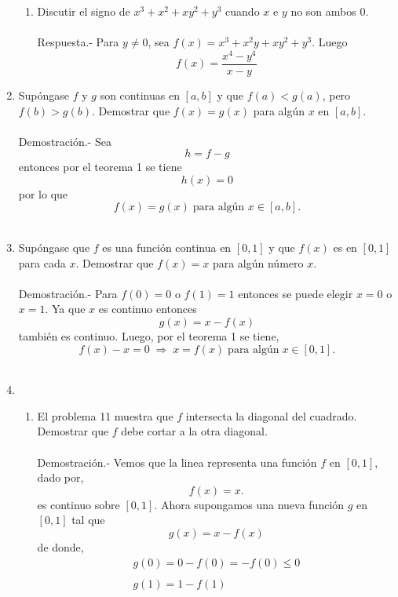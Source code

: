 \begin{enumerate}
\begin{enumerate}[\bfseries (a)]
	\item Discutir el signo de $x^3+x^2+xy^2+y^3$ cuando $x$ e $y$ no son ambos $0$.\\\\
	    Respuesta.-\; Para $y\neq 0$, sea $f(x)=x^3+x^2y+xy^2+y^3$. Luego
	    $$f(x)=\dfrac{x^4-y^4}{x-y}$$

    \end{enumerate}

\item Supóngase $f$ y $g$ son continuas en $[a,b]$ y que $f(a)<g(a)$, pero $f(b)>g(b)$. Demostrar que $f(x)=g(x)$ para algún $x$ en $[a,b]$.\\\\
    Demostración.-\; Sea $$h=f-g$$
    entonces por el teorema 1 se tiene $$h(x)=0$$
    por lo que $$f(x)=g(x)\; \mbox{para algún }x \in [a,b].$$\\

\item Supóngase que $f$ es una función continua en $[0,1]$ y que $f(x)$ es en $[0,1]$ para cada $x$. Demostrar que $f(x)=x$ para algún número $x$.\\\\
    Demostración.-\; Para $f(0)=0$ o $f(1)=1$ entonces se puede elegir $x=0$ o $x=1$. Ya que $x$ es continuo entonces $$g(x)=x-f(x)$$ también es continuo. Luego, por el teorema 1 se tiene,
    $$f(x) - x = 0 \; \Longrightarrow \; x=f(x) \; \mbox{para algún}\; x \in [0,1].$$\\

\item  
    \begin{enumerate}[\bfseries (a)]

	\item El problema 11 muestra que $f$ intersecta la diagonal del cuadrado. Demostrar que $f$ debe cortar a la otra diagonal.\\\\
	    Demostración.-\; Vemos que la linea representa una función $f$ en $[0,1]$, dado por,
	    $$f(x)=x.$$
	    es continuo sobre $[0,1]$. Ahora supongamos una nueva función $g$ en $[0,1]$ tal que
	    $$g(x)=x-f(x)$$
	    de donde,
	    $$\begin{array}{l}
		g(0)=0-f(0)=-f(0)\leq 0\\\\
		g(1)=1-f(1)\\
	    \end{array}$$


\end{enumerate}
\end{enumerate}
